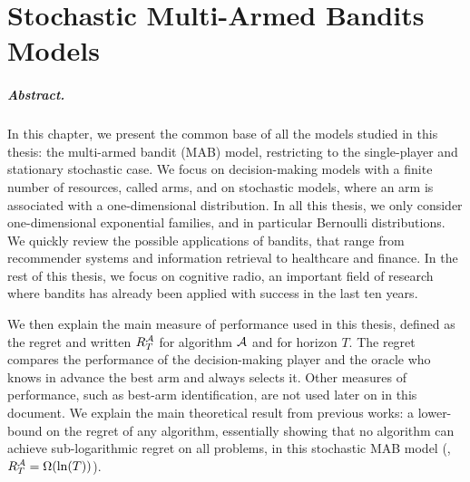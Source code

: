 
\chapter{Stochastic Multi-Armed Bandits Models}
\label{chapter:2}


\minitoc
\graphicspath{{2-Chapters/2-Chapter/Images/}}

\newpage


\paragraph{Abstract.}
%
In this chapter, we present the common base of all the models studied in this thesis:
the multi-armed bandit (MAB) model,
restricting to the single-player and stationary stochastic case.
We focus on decision-making models with a finite number of resources, called arms, and on stochastic models, where an arm is associated with a one-dimensional distribution.
In all this thesis, we only consider one-dimensional exponential families, and in particular Bernoulli distributions.
%
We quickly review the possible applications of bandits, that range from recommender systems and information retrieval to healthcare and finance. In the rest of this thesis, we focus on cognitive radio, an important field of research where bandits has already been applied with success in the last ten years.

We then explain the main measure of performance used in this thesis, defined as the regret and written $R_T^{\mathcal{A}}$ for algorithm $\mathcal{A}$ and for horizon $T$. The regret compares the performance of the decision-making player and the oracle who knows in advance the best arm and always selects it.
Other measures of performance, such as best-arm identification, are not used later on in this document.
%
We explain the main theoretical result from previous works: a lower-bound on the regret of any algorithm, essentially showing that no algorithm can achieve sub-logarithmic regret on all problems, in this stochastic MAB model (\ie, $R_T^{\mathcal{A}} = \Omega(\ln(T))$).


